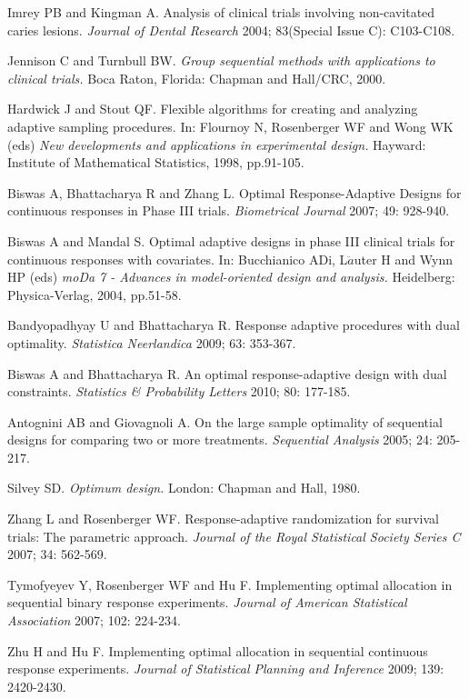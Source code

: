 \begin{thebibliography}
 Imrey PB and Kingman A. Analysis of clinical trials involving non-cavitated caries lesions. \textit{Journal of Dental Research} 2004; 83(Special Issue C): C103-C108.

 Jennison C and Turnbull BW. \textit{Group sequential methods with applications to clinical trials.} Boca Raton, Florida: Chapman and
Hall/CRC, 2000.

 Hardwick J and Stout QF.  Flexible algorithms for creating and analyzing adaptive sampling procedures. In: Flournoy N, Rosenberger WF and Wong WK (eds) \textit{New developments and applications in experimental design.} Hayward: Institute of Mathematical Statistics, 1998, pp.91-105.

 Biswas A, Bhattacharya R and Zhang L. Optimal Response-Adaptive Designs for continuous responses in Phase III  trials. \textit{Biometrical Journal} 2007; 49: 928-940.

 Biswas A and Mandal S. Optimal adaptive designs in
phase III clinical trials for continuous responses with covariates. In:  Bucchianico ADi, L$\ddot{a}$uter H and Wynn HP (eds) \textit{moDa 7 - Advances in model-oriented design and analysis.} Heidelberg: Physica-Verlag, 2004, pp.51-58.

  Bandyopadhyay U and Bhattacharya R. Response adaptive procedures with dual optimality. \textit{Statistica Neerlandica} 2009; 63: 353-367.

 Biswas A and Bhattacharya R. An optimal response-adaptive design with dual constraints. \textit{Statistics \& Probability Letters} 2010; 80: 177-185.

 Antognini AB and Giovagnoli A. On the large sample optimality of sequential designs for comparing two or more treatments. \textit{Sequential Analysis} 2005; 24: 205-217.

 Silvey SD. \textit{Optimum design.} London: Chapman and Hall, 1980.

 Zhang L and Rosenberger WF.  Response-adaptive randomization for survival trials: The parametric approach. \textit{Journal of the Royal Statistical Society Series C} 2007; 34: 562-569.

 Tymofyeyev Y, Rosenberger WF and Hu F.  Implementing optimal allocation in sequential binary response experiments. \textit{Journal of American Statistical Association} 2007; 102: 224-234.

  Zhu H and Hu F.  Implementing optimal allocation in sequential continuous response experiments. \textit{ Journal of  Statistical Planning and  Inference } 2009; 139: 2420-2430.


\end{thebibliography}
